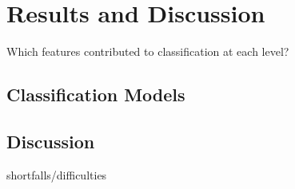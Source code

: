 \chapter{Results and Discussion}
Which features contributed to classification at each level?
\section{Classification Models}
\section{Discussion}
shortfalls/difficulties